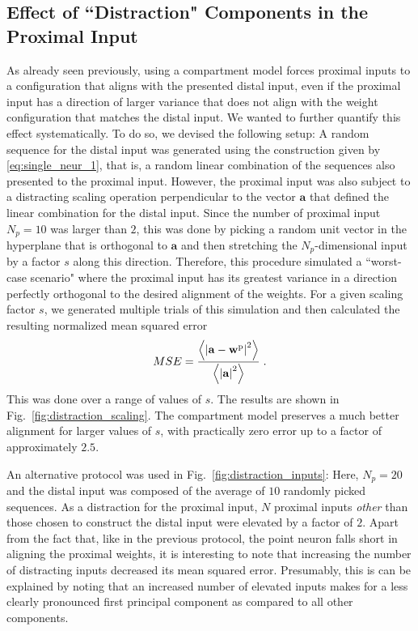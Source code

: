\documentclass[10pt,a4paper]{article}
\begin{document}
\subsection{Effect of ``Distraction" Components in the Proximal Input}
As already seen previously, using a compartment model forces proximal inputs to a configuration that aligns with the presented distal input, even if the proximal input has a direction of larger variance that does not align with the weight configuration that matches the distal input. We wanted to further quantify this effect systematically. To do so, we devised the following setup: A random sequence for the distal input was generated using the construction given by \eqref{eq:single_neur_1}, that is, a random linear combination of the sequences also presented to the proximal input. However, the proximal input was also subject to a distracting scaling operation perpendicular to the vector $\mathbf{a}$ that defined the linear combination for the distal input. Since the number of proximal input $N_p = 10$ was larger than $2$, this was done by picking a random unit vector in the hyperplane that is orthogonal to $\mathbf{a}$ and then stretching the $N_p$-dimensional input by a factor $s$ along this direction. Therefore, this procedure simulated a ``worst-case scenario" where the proximal input has its greatest variance in a direction perfectly orthogonal to the desired alignment of the weights. For a given scaling factor $s$, we generated multiple trials of this simulation and then calculated the resulting normalized mean squared error
\begin{equation}
	MSE = \frac{\left\langle \left\lvert \mathbf{a} - \mathbf{w}^{\rm p} \right\rvert^2\right\rangle}{\left\langle \left\lvert \mathbf{a}\right\rvert^2\right\rangle} \; .
\end{equation}
This was done over a range of values of $s$. The results are shown in Fig.~\ref{fig:distraction_scaling}. The compartment model preserves a much better alignment for larger values of $s$, with practically zero error up to a factor of approximately $2.5$.

An alternative protocol was used in Fig.~\ref{fig:distraction_inputs}: Here, $N_p = 20$ and the distal input was composed of the average of $10$ randomly picked sequences. As a distraction for the proximal input, $N$ proximal inputs \emph{other} than those chosen to construct the distal input were elevated by a factor of $2$. Apart from the fact that, like in the previous protocol, the point neuron falls short in aligning the proximal weights, it is interesting to note that increasing the number of distracting inputs decreased its mean squared error. Presumably, this is can be explained by noting that an increased number of elevated inputs makes for a less clearly pronounced first principal component as compared to all other components.
\end{document}

